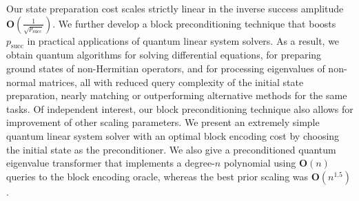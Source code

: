 \documentclass[letterpaper,onecolumn,11pt,accepted=2026-02-14]{quantumarticle}
\theoremstyle{remark}
\theoremstyle{plain}
\begin{document}
Our state preparation cost scales strictly linear in the inverse success amplitude $\mathbf{O}\left(\frac{1}{\sqrt{p_{\text{succ}}}}\right)$. We further develop a block preconditioning technique that boosts $p_{\text{succ}}$ in practical applications of quantum linear system solvers. As a result, we obtain quantum algorithms for solving differential equations, for preparing ground states of non-Hermitian operators, and for processing eigenvalues of non-normal matrices, all with reduced query complexity of the initial state preparation, nearly matching or outperforming alternative methods for the same tasks. Of independent interest, our block preconditioning technique also allows for improvement of other scaling parameters. We present an extremely simple quantum linear system solver with an optimal block encoding cost by choosing the initial state as the preconditioner. We also give a preconditioned quantum eigenvalue transformer that implements a degree-$n$ polynomial using $\mathbf{O}(n)$ queries to the block encoding oracle, whereas the best prior scaling was $\mathbf{O}(n^{1.5})$.
\end{document}
